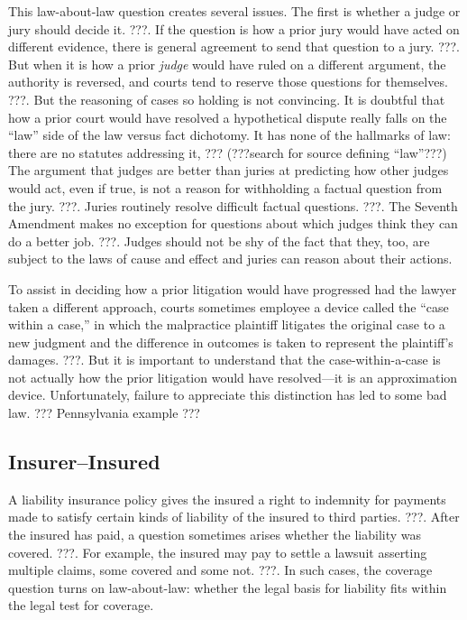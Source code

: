 \documentclass[
  12pt,
  letterpaper,
]{scrartcl}
\begin{document}
This law-about-law question creates several issues. The first is whether a
judge or jury should decide it. ???. If the question is how a prior jury would
have acted on different evidence, there is general agreement to send that
question to a jury. ???. But when it is how a prior \emph{judge} would have
ruled on a different argument, the authority is reversed, and courts tend to
reserve those questions for themselves. ???. But the reasoning of cases so
holding is not convincing. It is doubtful that how a prior court would have
resolved a hypothetical dispute really falls on the ``law'' side of the law
versus fact dichotomy. It has none of the hallmarks of law: there are no
statutes addressing it, ??? (???search for source defining ``law''???) The
argument that judges are better than juries at predicting how other judges
would act, even if true, is not a reason for withholding a factual question
from the jury. ???. Juries routinely resolve difficult factual questions. ???.
The Seventh Amendment makes no exception for questions about which judges think
they can do a better job. ???. Judges should not be shy of the fact that they,
too, are subject to the laws of cause and effect and juries can reason about
their actions.

To assist in deciding how a prior litigation would have progressed had the
lawyer taken a different approach, courts sometimes employee a device called the
``case within a case,'' in which the malpractice plaintiff litigates the
original case to a new judgment and the difference in outcomes is taken to
represent the plaintiff's damages. ???. But it is important to understand that
the case-within-a-case is not actually how the prior litigation would have
resolved---it is an approximation device. Unfortunately, failure to appreciate
this distinction has led to some bad law. ??? Pennsylvania example ???


\subsection{Insurer--Insured}

A liability insurance policy gives the insured a right to indemnity for
payments made to satisfy certain kinds of liability of the insured to third
parties. ???. After the insured has paid, a question sometimes arises whether
the liability was covered. ???. For example, the insured may pay to settle a
lawsuit asserting multiple claims, some covered and some not. ???. In such
cases, the coverage question turns on law-about-law: whether the legal basis
for liability fits within the legal test for coverage.
\end{document}
